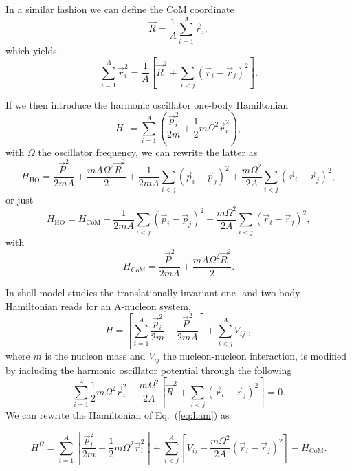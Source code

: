 \documentclass{article}
\begin{document}
In a similar fashion we can define the CoM coordinate
\begin{equation}
    \vec{R}=\frac{1}{A}\sum_{i=1}^{A}\vec{r}_i,
\end{equation}
which yields
\begin{equation}
\sum_{i=1}^A\vec{r}_i^2 =
\frac{1}{A}\left[\vec{R}^2+\sum_{i<j}(\vec{r}_i-\vec{r}_j)^2\right].
\end{equation}

If we then introduce the harmonic oscillator one-body Hamiltonian
\begin{equation}
     H_0= \sum_{i=1}^A\left(\frac{\vec{p}_i^2}{2m}+
          \frac{1}{2}m\Omega^2\vec{r}_i^2\right),
\end{equation}
with $\Omega$ the oscillator frequency,
we can rewrite the latter as 
\begin{equation}
     H_{\mathrm{HO}}= \frac{\vec{P}^2}{2mA}+\frac{mA\Omega^2\vec{R}^2}{2}
           +\frac{1}{2mA}\sum_{i<j}(\vec{p}_i-\vec{p}_j)^2
           +\frac{m\Omega^2}{2A}\sum_{i<j}(\vec{r}_i-\vec{r}_j)^2,
    \label{eq:obho}
\end{equation}
or just
\begin{equation}
H_{\mathrm{HO}}= H_{\mathrm{CoM}}+\frac{1}{2mA}\sum_{i<j}(\vec{p}_i-\vec{p}_j)^2
           +\frac{m\Omega^2}{2A}\sum_{i<j}(\vec{r}_i-\vec{r}_j)^2,
\end{equation}
with 
\begin{equation}
     H_{\mathrm{CoM}}= \frac{\vec{P}^2}{2mA}+\frac{mA\Omega^2\vec{R}^2}{2}.
\end{equation}

In shell model studies the translationally invariant one- and two-body 
Hamiltonian reads
for an A-nucleon system,
%
\begin{equation}\label{eq:ham}
H=\left[\sum_{i=1}^A\frac{\vec{p}_i^2}{2m} -\frac{\vec{P}^2}{2mA}\right] +\sum_{i<j}^A V_{ij} \; ,
\end{equation}
%
where $m$ is the nucleon mass and $V_{ij}$ the nucleon-nucleon interaction,
is  modified by including the harmonic oscillator potential through the 
following
\begin{equation}
\sum_{i=1}^A\frac{1}{2}m\Omega^2\vec{r}_i^2-
\frac{m\Omega^2}{2A}\left[\vec{R}^2+\sum_{i<j}(\vec{r}_i-\vec{r}_j)^2\right]=0.
\end{equation}
We can rewrite the Hamiltonian of Eq.~(\ref{eq:ham}) as

\begin{equation}\label{hamomega}
H^\Omega=\sum_{i=1}^A \left[ \frac{\vec{p}_i^2}{2m}
+\frac{1}{2}m\Omega^2 \vec{r}^2_i
\right] + \sum_{i<j}^A \left[ V_{ij}-\frac{m\Omega^2}{2A}
(\vec{r}_i-\vec{r}_j)^2
\right] -H_{\mathrm{CoM}}.
\end{equation}
\end{document}
